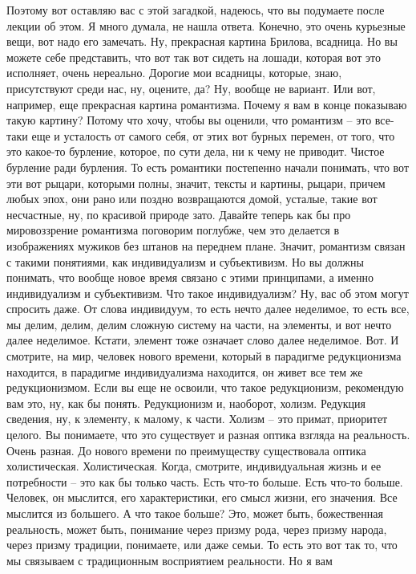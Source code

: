Поэтому вот оставляю вас с этой загадкой, надеюсь, что вы подумаете после лекции
об этом. Я много думала, не нашла ответа. Конечно, это очень курьезные вещи, вот
надо его замечать. Ну, прекрасная картина Брилова, всадница. Но вы можете себе
представить, что вот так вот сидеть на лошади, которая вот это исполняет, очень
нереально. Дорогие мои всадницы, которые, знаю, присутствуют среди нас, ну,
оцените, да? Ну, вообще не вариант. Или вот, например, еще прекрасная картина
романтизма. Почему я вам в конце показываю такую картину? Потому что хочу, чтобы
вы оценили, что романтизм – это все-таки еще и усталость от самого себя, от этих
вот бурных перемен, от того, что это какое-то бурление, которое, по сути дела,
ни к чему не приводит. Чистое бурление ради бурления. То есть романтики
постепенно начали понимать, что вот эти вот рыцари, которыми полны, значит,
тексты и картины, рыцари, причем любых эпох, они рано или поздно возвращаются
домой, усталые, такие вот несчастные, ну, по красивой природе зато. Давайте
теперь как бы про мировоззрение романтизма поговорим поглубже, чем это делается
в изображениях мужиков без штанов на переднем плане. Значит, романтизм связан с
такими понятиями, как индивидуализм и субъективизм. Но вы должны понимать, что
вообще новое время связано с этими принципами, а именно индивидуализм и
субъективизм. Что такое индивидуализм? Ну, вас об этом могут спросить даже. От
слова индивидуум, то есть нечто далее неделимое, то есть все, мы делим, делим,
делим сложную систему на части, на элементы, и вот нечто далее неделимое.
Кстати, элемент тоже означает слово далее неделимое. Вот. И смотрите, на мир,
человек нового времени, который в парадигме редукционизма находится, в парадигме
индивидуализма находится, он живет все тем же редукционизмом. Если вы еще не
освоили, что такое редукционизм, рекомендую вам это, ну, как бы понять.
Редукционизм и, наоборот, холизм. Редукция сведения, ну, к элементу, к малому, к
части. Холизм – это примат, приоритет целого. Вы понимаете, что это существует и
разная оптика взгляда на реальность. Очень разная. До нового времени по
преимуществу существовала оптика холистическая. Холистическая. Когда, смотрите,
индивидуальная жизнь и ее потребности – это как бы только часть. Есть что-то
больше. Есть что-то больше. Человек, он мыслится, его характеристики, его смысл
жизни, его значения. Все мыслится из большего. А что такое больше? Это, может
быть, божественная реальность, может быть, понимание через призму рода, через
призму народа, через призму традиции, понимаете, или даже семьи. То есть это вот
так то, что мы связываем с традиционным восприятием реальности. Но я вам
